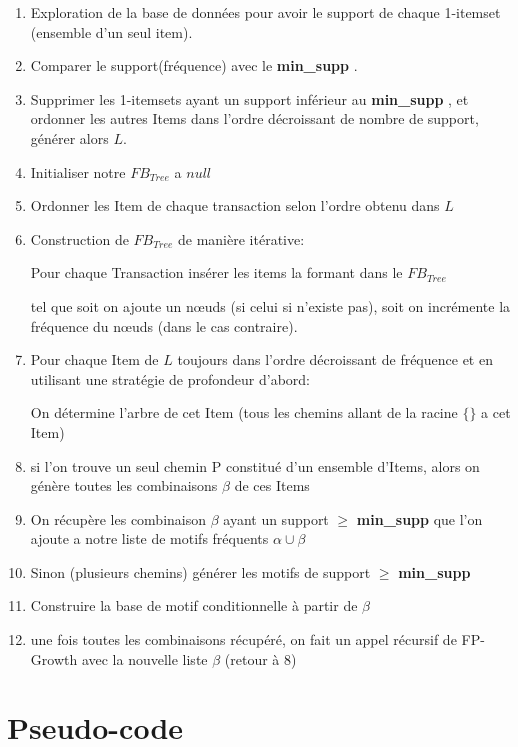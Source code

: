 \documentclass[12pt,a4paper,oneside]{book}
\begin{document}
\begin{enumerate}
\item Exploration de la base de données pour avoir le support de chaque 1-itemset (ensemble d'un seul item).
\item Comparer le support(fréquence) avec le\textbf{ min\_supp} .
\item  Supprimer les 1-itemsets ayant un support inférieur au \textbf{ min\_supp} , et ordonner les autres Items dans l'ordre décroissant de nombre de support, générer alors $L$.
\item Initialiser notre $FB_{Tree}$ a $null$
\item Ordonner les Item de chaque transaction selon l'ordre obtenu dans $L$
\item Construction de $FB_{Tree}$ de manière itérative:

 Pour chaque Transaction insérer les items la formant dans le $FB_{Tree}$

tel que soit on ajoute un nœuds (si celui si n'existe pas), soit on incrémente la fréquence du nœuds (dans le cas contraire).

\item Pour chaque Item de $L$ toujours dans l'ordre décroissant de fréquence et en utilisant une stratégie de profondeur d'abord:

On détermine l'arbre de cet Item (tous les chemins allant de la racine $\{\}$ a cet Item)

\item si l'on trouve un seul chemin P constitué d'un ensemble d'Items, alors on génère toutes les combinaisons  $\beta$ de ces Items 
 
\item On récupère les combinaison $\beta$ ayant un support $\geq$ \textbf{ min\_supp} que l'on ajoute a notre liste de motifs fréquents $\alpha \cup \beta$

\item Sinon (plusieurs chemins) générer les motifs de support $\geq$ \textbf{ min\_supp}

\item Construire la base de motif conditionnelle à partir de $\beta$  

\item une fois toutes les combinaisons récupéré, on fait un appel récursif de FP-Growth avec la nouvelle liste $\beta$ (retour à 8)
\end{enumerate}


\newpage

\section{Pseudo-code}
\end{document}
